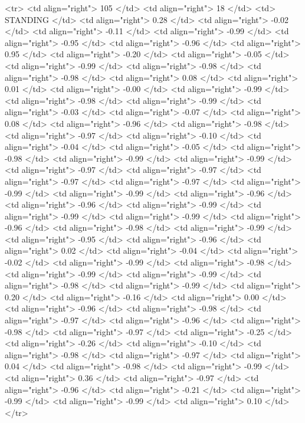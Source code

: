   <tr> <td align="right"> 105 </td> <td align="right">  18 </td> <td> STANDING </td> <td align="right"> 0.28 </td> <td align="right"> -0.02 </td> <td align="right"> -0.11 </td> <td align="right"> -0.99 </td> <td align="right"> -0.95 </td> <td align="right"> -0.96 </td> <td align="right"> 0.95 </td> <td align="right"> -0.20 </td> <td align="right"> -0.05 </td> <td align="right"> -0.99 </td> <td align="right"> -0.98 </td> <td align="right"> -0.98 </td> <td align="right"> 0.08 </td> <td align="right"> 0.01 </td> <td align="right"> -0.00 </td> <td align="right"> -0.99 </td> <td align="right"> -0.98 </td> <td align="right"> -0.99 </td> <td align="right"> -0.03 </td> <td align="right"> -0.07 </td> <td align="right"> 0.08 </td> <td align="right"> -0.96 </td> <td align="right"> -0.98 </td> <td align="right"> -0.97 </td> <td align="right"> -0.10 </td> <td align="right"> -0.04 </td> <td align="right"> -0.05 </td> <td align="right"> -0.98 </td> <td align="right"> -0.99 </td> <td align="right"> -0.99 </td> <td align="right"> -0.97 </td> <td align="right"> -0.97 </td> <td align="right"> -0.97 </td> <td align="right"> -0.97 </td> <td align="right"> -0.99 </td> <td align="right"> -0.99 </td> <td align="right"> -0.96 </td> <td align="right"> -0.96 </td> <td align="right"> -0.99 </td> <td align="right"> -0.99 </td> <td align="right"> -0.99 </td> <td align="right"> -0.96 </td> <td align="right"> -0.98 </td> <td align="right"> -0.99 </td> <td align="right"> -0.95 </td> <td align="right"> -0.96 </td> <td align="right"> 0.02 </td> <td align="right"> -0.04 </td> <td align="right"> -0.02 </td> <td align="right"> -0.99 </td> <td align="right"> -0.98 </td> <td align="right"> -0.99 </td> <td align="right"> -0.99 </td> <td align="right"> -0.98 </td> <td align="right"> -0.99 </td> <td align="right"> 0.20 </td> <td align="right"> -0.16 </td> <td align="right"> 0.00 </td> <td align="right"> -0.96 </td> <td align="right"> -0.98 </td> <td align="right"> -0.97 </td> <td align="right"> -0.96 </td> <td align="right"> -0.98 </td> <td align="right"> -0.97 </td> <td align="right"> -0.25 </td> <td align="right"> -0.26 </td> <td align="right"> -0.10 </td> <td align="right"> -0.98 </td> <td align="right"> -0.97 </td> <td align="right"> 0.04 </td> <td align="right"> -0.98 </td> <td align="right"> -0.99 </td> <td align="right"> 0.36 </td> <td align="right"> -0.97 </td> <td align="right"> -0.96 </td> <td align="right"> -0.21 </td> <td align="right"> -0.99 </td> <td align="right"> -0.99 </td> <td align="right"> 0.10 </td> </tr>
